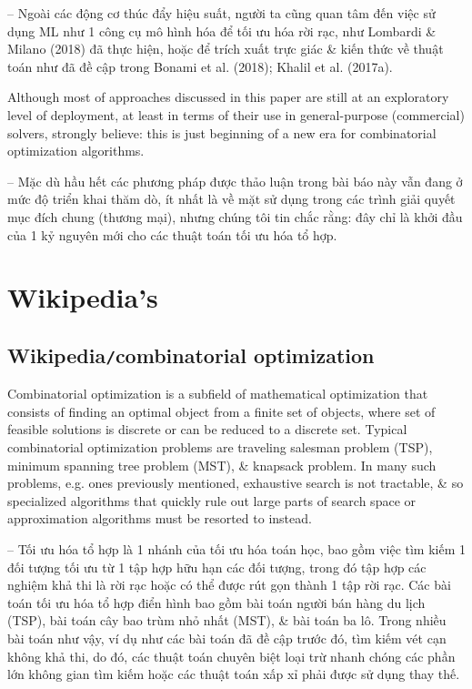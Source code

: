 \documentclass{article}
\begin{document}
\begin{itemize}
    -- Ngoài các động cơ thúc đẩy hiệu suất, người ta cũng quan tâm đến việc sử dụng ML như 1 công cụ mô hình hóa để tối ưu hóa rời rạc, như Lombardi \& Milano (2018) đã thực hiện, hoặc để trích xuất trực giác \& kiến thức về thuật toán như đã đề cập trong Bonami et al. (2018); Khalil et al. (2017a).

    Although most of approaches discussed in this paper are still at an exploratory level of deployment, at least in terms of their use in general-purpose (commercial) solvers, strongly believe: this is just beginning of a new era for combinatorial optimization algorithms.

    -- Mặc dù hầu hết các phương pháp được thảo luận trong bài báo này vẫn đang ở mức độ triển khai thăm dò, ít nhất là về mặt sử dụng trong các trình giải quyết mục đích chung (thương mại), nhưng chúng tôi tin chắc rằng: đây chỉ là khởi đầu của 1 kỷ nguyên mới cho các thuật toán tối ưu hóa tổ hợp.
\end{itemize}


\section{Wikipedia's}


\subsection{Wikipedia{\tt/}combinatorial optimization}
Combinatorial optimization is a subfield of mathematical optimization that consists of finding an optimal object from a finite set of objects, where set of feasible solutions is discrete or can be reduced to a discrete set. Typical combinatorial optimization problems are traveling salesman problem (TSP), minimum spanning tree problem (MST), \& knapsack problem. In many such problems, e.g. ones previously mentioned, exhaustive search is not tractable, \& so specialized algorithms that quickly rule out large parts of search space or approximation algorithms must be resorted to instead.

-- Tối ưu hóa tổ hợp là 1 nhánh của tối ưu hóa toán học, bao gồm việc tìm kiếm 1 đối tượng tối ưu từ 1 tập hợp hữu hạn các đối tượng, trong đó tập hợp các nghiệm khả thi là rời rạc hoặc có thể được rút gọn thành 1 tập rời rạc. Các bài toán tối ưu hóa tổ hợp điển hình bao gồm bài toán người bán hàng du lịch (TSP), bài toán cây bao trùm nhỏ nhất (MST), \& bài toán ba lô. Trong nhiều bài toán như vậy, ví dụ như các bài toán đã đề cập trước đó, tìm kiếm vét cạn không khả thi, do đó, các thuật toán chuyên biệt loại trừ nhanh chóng các phần lớn không gian tìm kiếm hoặc các thuật toán xấp xỉ phải được sử dụng thay thế.
\end{document}
